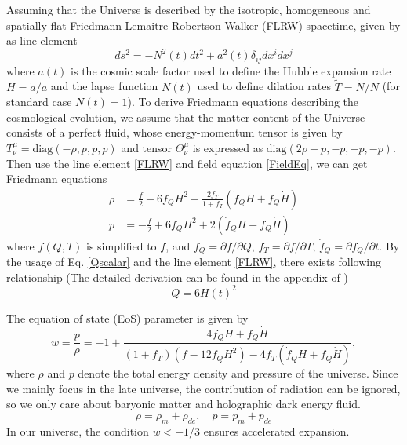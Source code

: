 \documentclass[preprint]{aastex631}
\begin{document}
Assuming that the Universe is described by the isotropic, homogeneous and spatially flat Friedmann-Lemaitre-Robertson-Walker (FLRW) spacetime, given by as line element
\begin{equation}
ds^2=-N^2(t)dt^2+a^2(t)\delta_{ij} dx^i dx^j\label{FLRW}
\end{equation}
where $a(t)$ is the cosmic scale factor
used to define the Hubble expansion rate $H=\dot{a}/a$ and the lapse function $N(t)$ used to define dilation rates $\tilde{T}=\dot{N}/N$ (for standard case $N(t)=1$). To derive Friedmann equations describing the cosmological evolution, we assume that the matter content of the Universe consists of a perfect fluid, whose  energy-momentum tensor is given by $T^{\mu}_\nu=\text{diag}(-\rho,p,p,p)$ and tensor $\Theta^{\mu}_\nu$ is expressed as $\text{diag}(2\rho+p,-p,-p,-p)$. Then use the line element \eqref{FLRW} and field equation \eqref{FieldEq}, we can get Friedmann equations
\begin{align}
\rho &=\frac{f}{2}-6f_Q H^2-\frac{2f_T}{1+f_T}(\dot{f}_QH+f_Q \dot{H}) \\
p &=-\frac{f}{2}+6f_Q H^2+2(\dot{f}_QH+f_Q \dot{H})
\end{align}
where $f(Q,T)$ is simplified to $f$, and $f_Q=\partial f/\partial Q$, $f_T=\partial f/\partial T$, $\dot{f}_Q=\partial f_Q/\partial t$. By the usage of Eq. \eqref{Qscalar} and the line element \eqref{FLRW}, there exists following relationship (The detailed derivation can be found in the appendix of \cite{Xu_2019})
\begin{equation}
    Q=6H(t)^2
\end{equation}

The equation of state (EoS) parameter is given by
\begin{equation}
    w=\frac{p}{\rho}=-1+\frac{4 f_Q H+f_Q \dot{H}}{(1+f_T)(f-12f_QH^2)-4 f_T(\dot{f}_QH+f_Q \dot{H})},
\end{equation}
where $\rho$ and $p$ denote the total energy density and pressure of the universe. Since we mainly focus in the late universe, the contribution of radiation can be ignored, so we only care about baryonic matter and holographic dark energy fluid.
\begin{equation}
    \rho=\rho_m+\rho_{de}, \quad p=p_m+p_{de}
\end{equation}
In our universe, the condition $w < -1/3$ ensures accelerated expansion. 
\end{document}
